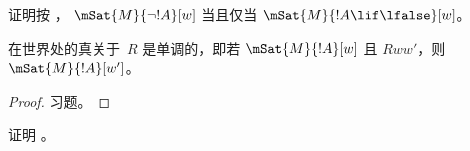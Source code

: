 \documentclass[../../../include/open-logic-section]{subfiles}
\begin{document}
\begin{prob}
  证明按 ，
  $\mSat{M}{\lnot !A}[w]$ 当且仅当 $\mSat{M}{!A \lif \lfalse}[w]$。
\end{prob}

\begin{prop}
  在世界处的真关于~$R$ 是单调的，即若
  $\mSat{M}{!A}[w]$ 且 $Rww'$，则 $\mSat{M}{!A}[w']$。
\end{prop}

\begin{proof}
  习题。
\end{proof}

\begin{prob}
  证明 。
\end{prob}
\end{document}
